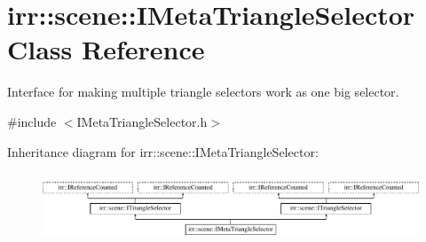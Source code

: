 \hypertarget{classirr_1_1scene_1_1IMetaTriangleSelector}{}\section{irr\+:\+:scene\+:\+:I\+Meta\+Triangle\+Selector Class Reference}
\label{classirr_1_1scene_1_1IMetaTriangleSelector}


Interface for making multiple triangle selectors work as one big selector.  




{\ttfamily \#include $<$I\+Meta\+Triangle\+Selector.\+h$>$}

Inheritance diagram for irr\+:\+:scene\+:\+:I\+Meta\+Triangle\+Selector\+:\begin{figure}[H]
\begin{center}
\leavevmode
\includegraphics[height=2.068965cm]{classirr_1_1scene_1_1IMetaTriangleSelector}
\end{center}
\end{figure}
